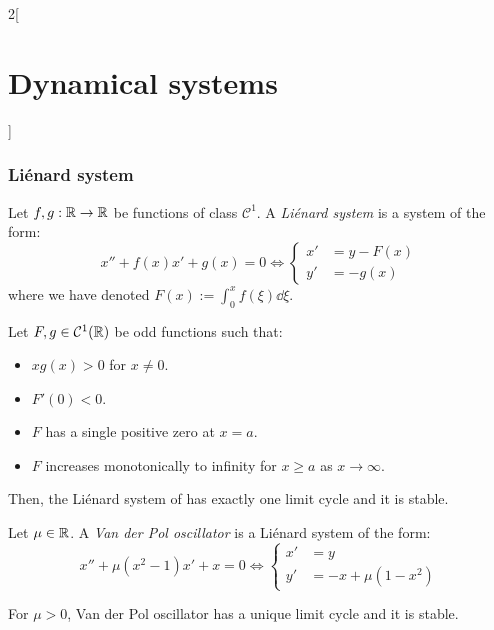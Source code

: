 \documentclass[../../../main_math.tex]{subfiles}
\begin{document}
\begin{multicols}{2}[\section{Dynamical systems}]
  \subsubsection{Liénard system}
  \begin{definition}
    Let $f,g:\mathbb{R}\rightarrow\mathbb{R}$ be functions of class $\mathcal{C}^1$. A \emph{Liénard system} is a system of the form:
    \begin{equation}\label{DS:lienard}
      x''+f(x)x'+g(x)=0\iff\left\{
      \begin{aligned}
        x' & =y-F(x) \\
        y' & =-g(x)
      \end{aligned}
      \right.
    \end{equation}
    where we have denoted $F(x):=\int_0^xf(\xi)\dd{\xi}$.
  \end{definition}
  \begin{theorem}
    Let $F,g\in \mathcal{C}^1(\mathbb{R})$ be odd functions such that:
    \begin{itemize}
      \item $xg(x)>0$ for $x\ne 0$.
      \item $F'(0)<0$.
      \item $F$ has a single positive zero at $x=a$.
      \item $F$ increases monotonically to infinity for $x\geq a$ as $x\to\infty$.
    \end{itemize}
    Then, the Liénard system of  has exactly one limit cycle and it is stable.
  \end{theorem}
  \begin{definition}
    Let $\mu\in\mathbb{R}$. A \emph{Van der Pol oscillator} is a Liénard system of the form:
    \begin{equation}\label{DS:vanderpol}
      x''+\mu(x^2-1)x'+x=0\iff\left\{
      \begin{aligned}
        x' & =y              \\
        y' & =-x +\mu(1-x^2)
      \end{aligned}
      \right.
    \end{equation}
  \end{definition}
  \begin{corollary}
    For $\mu>0$, Van der Pol oscillator has a unique limit cycle and it is stable.
  \end{corollary}

\end{multicols}
\end{document}
